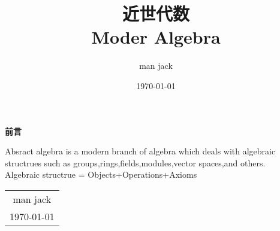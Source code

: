 \title{{\Huge{\textbf{近世代数}}} \\ Moder Algebra }
\author{man jack}
\date{\today} 
\maketitle            %

\thispagestyle{empty} %

\begin{center}
    \Huge\textbf{前言}
\end{center}

Absract algebra is a modern branch of algebra which deals with algebraic structrues such as groups,rings,fields,modules,vector spaces,and others.
\\
Algebraic structrue = Objects+Operations+Axioms
\begin{flushright}
    \begin{tabular}{c}
        man jack\\
        \today       
    \end{tabular}
\end{flushright}

\newpage		%
\pagestyle{plain}	%
\setcounter{page}{1}	%
\tableofcontents        %

\newpage

\pagestyle{plain}
\setcounter{page}{1}    %
